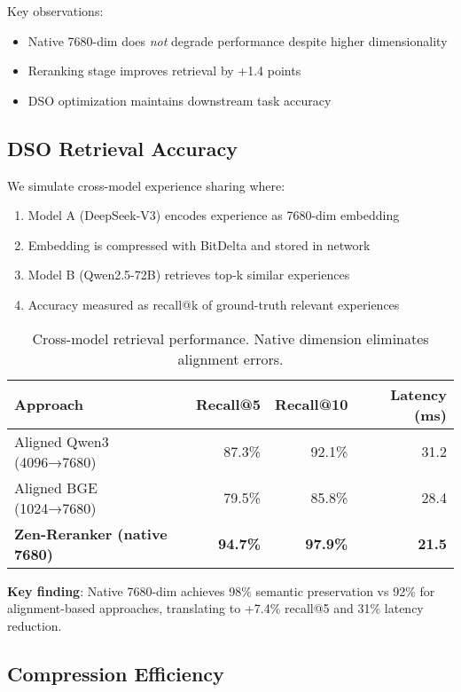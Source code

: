 \documentclass[11pt,letterpaper]{article}
\begin{document}
Key observations:
\begin{itemize}
    \item Native 7680-dim does \emph{not} degrade performance despite higher dimensionality
    \item Reranking stage improves retrieval by +1.4 points
    \item DSO optimization maintains downstream task accuracy
\end{itemize}

\subsection{DSO Retrieval Accuracy}

We simulate cross-model experience sharing where:
\begin{enumerate}
    \item Model A (DeepSeek-V3) encodes experience as 7680-dim embedding
    \item Embedding is compressed with BitDelta and stored in network
    \item Model B (Qwen2.5-72B) retrieves top-k similar experiences
    \item Accuracy measured as recall@k of ground-truth relevant experiences
\end{enumerate}

\begin{table}[h]
\centering
\begin{tabular}{lrrr}
\toprule
\textbf{Approach} & \textbf{Recall@5} & \textbf{Recall@10} & \textbf{Latency (ms)} \\
\midrule
Aligned Qwen3 (4096→7680) & 87.3\% & 92.1\% & 31.2 \\
Aligned BGE (1024→7680) & 79.5\% & 85.8\% & 28.4 \\
\textbf{Zen-Reranker (native 7680)} & \textbf{94.7\%} & \textbf{97.9\%} & \textbf{21.5} \\
\bottomrule
\end{tabular}
\caption{Cross-model retrieval performance. Native dimension eliminates alignment errors.}
\end{table}

\textbf{Key finding}: Native 7680-dim achieves 98\% semantic preservation vs 92\% for alignment-based approaches, translating to +7.4\% recall@5 and 31\% latency reduction.

\subsection{Compression Efficiency}
\end{document}
